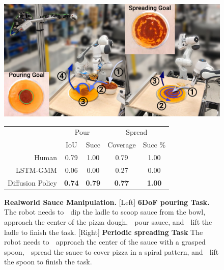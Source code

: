 \documentclass[Afour,sageh,times]{sagej}
\begin{document}
\begin{figure}[t]
\centering
\includegraphics[width=\linewidth]{figure/real_sauce_setup.pdf}

\vspace{1.5mm}


\small
\begin{tabular}{r|c|c|c|c}
\toprule
         & \multicolumn{2}{c|}{Pour} & \multicolumn{2}{c}{Spread}    \\
         & IoU & Succ & Coverage & Succ \% \\
\midrule
Human  & 0.79 &     1.00  & 0.79  &    1.00      \\
\midrule
LSTM-GMM & 0.06 & 0.00  &  0.27  & 0.00           \\
Diffusion Policy  &  \textbf{0.74} &\textbf{0.79}   & \textbf{0.77}  & \textbf{1.00}   \\
\bottomrule
\end{tabular}


\caption{\textbf{Realworld Sauce Manipulation. }
\label{fig:real_sauce_manipulation}
[Left] \textbf{6DoF pouring Task.} The robot needs to \textcircled{} dip the ladle to scoop sauce from the bowl, \textcircled{} approach the center of the pizza dough, \textcircled{} pour sauce, and \textcircled{} lift the ladle to finish the task.
[Right] \textbf{Periodic spreading Task} The robot needs to \textcircled{} approach the center of the sauce with a grasped spoon, \textcircled{} spread the sauce to cover pizza in a spiral pattern, and \textcircled{} lift the spoon to finish the task.
}

\vspace{-4mm}
\end{figure}
\end{document}
